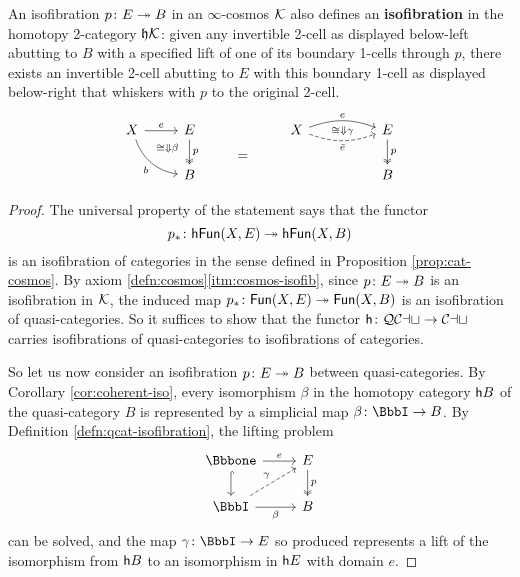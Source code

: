   \begin{prop}\label{prop:isofib-define-isofib} An isofibration $p \colon E \twoheadrightarrow B$  in an $\infty$-cosmos ${\mathord{\mathcal{K}}}$ also defines an \textbf{isofibration} in the homotopy 2-category $\mathfrak{h}{\mathord{\mathcal{K}}}$: given any invertible 2-cell as displayed below-left abutting to $B$ with a specified lift of one of its boundary 1-cells through $p$, there exists an invertible 2-cell abutting to $E$ with this boundary 1-cell as displayed below-right that whiskers with $p$ to the original 2-cell.
  \[
    \begin{tikzcd} X \arrow[r, "e"] \arrow[dr, bend right, "b"'] & E \arrow[d, two heads, "p"] \arrow[dl, phantom, "{\scriptstyle\cong\Downarrow\beta}" near start] &\arrow[d, phantom, "="] & X \arrow[rr, start anchor=15, end anchor=165, bend left=20, "e"] \arrow[rr, start anchor=345, end anchor=195, bend right=20, "\bar{e}"', dashed] \arrow[rr, phantom, "{\scriptstyle\cong\Downarrow\gamma}"] && E \arrow[d, two heads, "p"] \\ ~ & B & ~ & & & B
  \end{tikzcd}
  \]
  \end{prop}
  \begin{proof} The universal property of the statement says that the functor \[p_* \colon {\mathord{\mathsf{hFun}}}(X,E) \twoheadrightarrow {\mathord{\mathsf{hFun}}}(X,B)\] is an isofibration of categories in the sense defined in Proposition \ref{prop:cat-cosmos}. By axiom \ref{defn:cosmos}\ref{itm:cosmos-isofib}, since $p \colon E \twoheadrightarrow B$ is an isofibration in ${\mathord{\mathcal{K}}}$, the induced map $p_* \colon {\mathord{\mathsf{Fun}}}(X,E) \twoheadrightarrow {\mathord{\mathsf{Fun}}}(X,B)$ is an isofibration of quasi-categories. So it suffices to show that the functor ${\mathord{\mathsf{h}}} \colon {\mathord{\mathcal{QCat}}}\to {\mathord{\mathcal{Cat}}}$ carries isofibrations of quasi-categories to isofibrations of categories.

  So let us now consider an isofibration $p \colon E \twoheadrightarrow B$ between quasi-categories. By Corollary \ref{cor:coherent-iso}, every isomorphism $\beta$ in the homotopy category ${\mathord{\mathsf{h}}}{B}$ of the quasi-category $B$ is represented by a simplicial map $\beta \colon \iso \to B$. By Definition \ref{defn:qcat-isofibration}, the lifting problem
  \[
  \begin{tikzcd}
  \catone \arrow[r, "e"] \arrow[d, hook] & E \arrow[d, two heads, "p"] \\ \iso \arrow[ur, dashed, "\gamma"] \arrow[r, "\beta"'] & B
  \end{tikzcd}
  \]
  can be solved, and the map $\gamma \colon \iso \to E$ so produced represents a lift of the isomorphism from ${\mathord{\mathsf{h}}}{B}$ to an isomorphism in ${\mathord{\mathsf{h}}}{E}$ with domain $e$.
  \end{proof}

